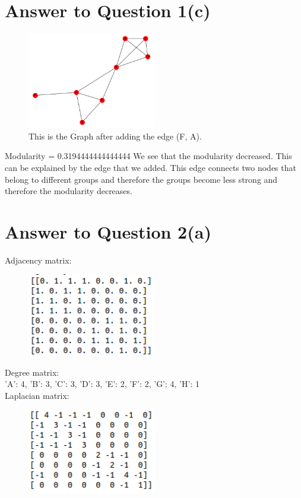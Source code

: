 \documentclass[11pt]{article}
\begin{document}
\section*{Answer to Question 1(c)}
\begin{figure}[h]
\caption{This is the Graph after adding the edge (F, A).}
\centering
\includegraphics[width=0.5\textwidth]{./figures/G_c}
\end{figure}
Modularity =  0.3194444444444444
We see that the modularity decreased. This can be explained by the edge that we added. This edge connects two nodes that belong to different groups and therefore the groups become less strong and therefore the modularity decreases.


\section*{Answer to Question 2(a)}
Adjacency matrix: 
\begin{figure}[h]
\centering
\includegraphics[width=0.5\textwidth]{./figures/adjacency}
\end{figure}

Degree matrix:\\
{'A': 4, 'B': 3, 'C': 3, 'D': 3, 'E': 2, 'F': 2, 'G': 4, 'H': 1}\\

Laplacian matrix: 
\begin{figure}[h]
\centering
\includegraphics[width=0.5\textwidth]{./figures/Laplacian}
\end{figure}
\end{document}
